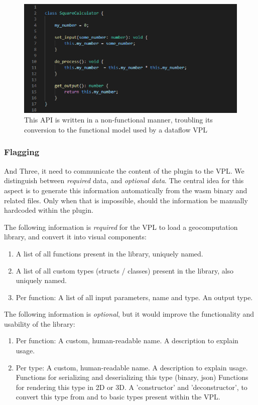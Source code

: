 \begin{figure}
  \centering
  \graphicspath{ {../../assets/images/6/3/} }
  \includegraphics[width=\linewidth]{ugly-oop.png}
  \caption[]{This API is written in a non-functional manner, troubling its conversion to the functional model used by a dataflow VPL}
  \label{fig:oop-considered-harmful}
\end{figure}

\subsubsection{Flagging}

And Three, it need to communicate the content of the plugin to the VPL. 
We distinguish between \emph{required} data, and \emph{optional data}.
The central idea for this aspect is to generate this information automatically from the wasm binary and related files.
Only when that is impossible, should the information be manually hardcoded within the plugin.

The following information is \emph{required} for the VPL to load a geocomputation library, and convert it into visual components:

\begin{enumerate}[-]
  \item A list of all functions present in the library, uniquely named.
  \item A list of all custom types (structs / classes) present in the library, also uniquely named.
  \item Per function:  
  \subitem A list of all input parameters, name and type.
  \subitem An output type.
\end{enumerate}

The following information is \emph{optional}, but it would improve the functionality and usability of the library:
\begin{enumerate}[-]
  \item Per function:
  \subitem A custom, human-readable name.
  \subitem A description to explain usage.

  \item Per type:
  \subitem A custom, human-readable name.
  \subitem A description to explain usage.
  \subitem Functions for serializing and deserializing this type (binary, json)  
  \subitem Functions for rendering this type in 2D or 3D.
  \subitem A 'constructor' and 'deconstructor', to convert this type from and to basic types present within the VPL.  
\end{enumerate}

